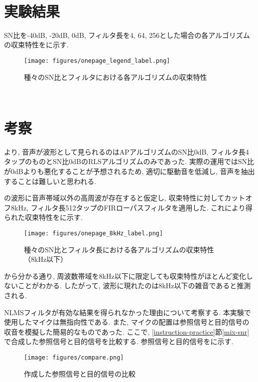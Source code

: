 \newpage

\
\section{実験結果}\label{result-practice}

SN比を-40dB, -20dB, 0dB, フィルタ長を4, 64, 256とした場合の各アルゴリズムの収束特性をに示す. 
\begin{figure}[H]
\centering
\texttt{[image: figures/onepage\_legend\_label.png]}
\caption{種々のSN比とフィルタにおける各アルゴリズムの収束特性}
\label{fig:onepage}
\end{figure}

\newpage

\
\section{考察}\label{consideration-practice}

より, 音声が波形として見られるのはAPアルゴリズムのSN比0dB, フィルタ長4タップのものとSN比0dBのRLSアルゴリズムのみであった. 実際の運用ではSN比が0dBよりも悪化することが予想されるため, 適切に駆動音を低減し, 音声を抽出することは難しいと思われる. 

\figref{fig:onepage}の波形に音声帯域以外の高周波が存在すると仮定し, 収束特性に対してカットオフ8kHz, フィルタ長512タップのFIRローパスフィルタを適用した. これにより得られた収束特性を\figref{fig:onepage_8kHz}に示す. 

\begin{figure}[H]
\centering
\texttt{[image: figures/onepage\_8kHz\_label.png]}
\caption{種々のSN比とフィルタ長における各アルゴリズムの収束特性（8kHz以下）}
\label{fig:onepage_8kHz}
\end{figure}

から分かる通り, 周波数帯域を8kHz以下に限定しても収束特性がほとんど変化しないことがわかる. したがって, 波形に現れたのは8kHz以下の雑音であると推測される. 

NLMSフィルタが有効な結果を得られなかった理由について考察する. 本実験で使用したマイクは無指向性である. また, マイクの配置は参照信号と目的信号の収音を模擬した簡易的なものであった. ここで, \ref{instruction-practice}節\ref{mix-snr}で合成した参照信号と目的信号を比較する. 参照信号と目的信号をに示す. 

\begin{figure}[H]
\centering
\texttt{[image: figures/compare.png]}
\caption{作成した参照信号と目的信号の比較}
\label{fig:compare_x_d}
\end{figure}

